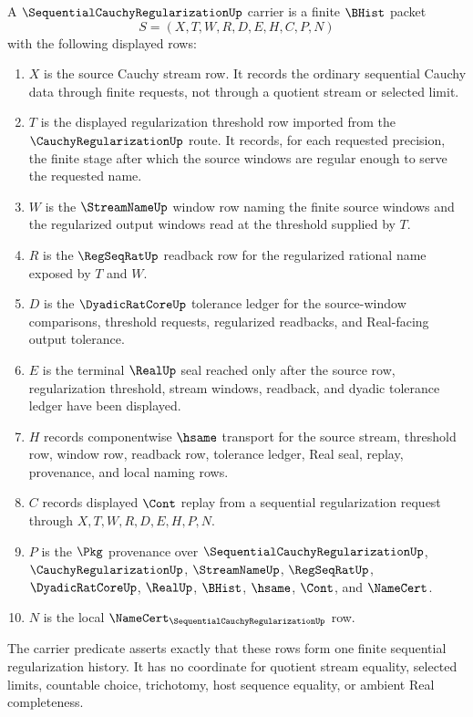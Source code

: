 \begin{definition}
\label{def:sequential-cauchy-regularization-carrier}
A $\SequentialCauchyRegularizationUp$ carrier is a finite $\BHist$ packet
$$
S=(X,T,W,R,D,E,H,C,P,N)
$$
with the following displayed rows:
\begin{enumerate}
\item $X$ is the source Cauchy stream row. It records the ordinary sequential Cauchy data through finite requests, not through a quotient stream or selected limit.
\item $T$ is the displayed regularization threshold row imported from the $\CauchyRegularizationUp$ route. It records, for each requested precision, the finite stage after which the source windows are regular enough to serve the requested name.
\item $W$ is the $\StreamNameUp$ window row naming the finite source windows and the regularized output windows read at the threshold supplied by $T$.
\item $R$ is the $\RegSeqRatUp$ readback row for the regularized rational name exposed by $T$ and $W$.
\item $D$ is the $\DyadicRatCoreUp$ tolerance ledger for the source-window comparisons, threshold requests, regularized readbacks, and Real-facing output tolerance.
\item $E$ is the terminal $\RealUp$ seal reached only after the source row, regularization threshold, stream windows, readback, and dyadic tolerance ledger have been displayed.
\item $H$ records componentwise $\hsame$ transport for the source stream, threshold row, window row, readback row, tolerance ledger, Real seal, replay, provenance, and local naming rows.
\item $C$ records displayed $\Cont$ replay from a sequential regularization request through $X,T,W,R,D,E,H,P,N$.
\item $P$ is the $\Pkg$ provenance over $\SequentialCauchyRegularizationUp$, $\CauchyRegularizationUp$, $\StreamNameUp$, $\RegSeqRatUp$, $\DyadicRatCoreUp$, $\RealUp$, $\BHist$, $\hsame$, $\Cont$, and $\NameCert$.
\item $N$ is the local $\NameCert_{\SequentialCauchyRegularizationUp}$ row.
\end{enumerate}
The carrier predicate asserts exactly that these rows form one finite sequential regularization history. It has no coordinate for quotient stream equality, selected limits, countable choice, trichotomy, host sequence equality, or ambient Real completeness.
\end{definition}

